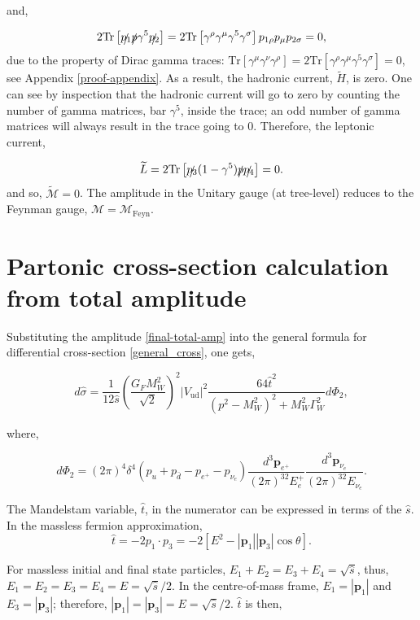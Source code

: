 \documentclass[a4paper,11pt]{article}
\begin{document}
and,

$$2\text{Tr}\left[\slashed{p_1}\slashed{p}\gamma^5\slashed{p_2}\right] = 2\text{Tr}\left[\gamma^\rho \gamma^\mu \gamma^5 \gamma^\sigma\right] p_{1\rho}p_\mu p_{2\sigma} = 0,$$
due to the property of Dirac gamma traces: $\text{Tr}\left[\gamma^\mu \gamma^\nu \gamma^\rho \right] = 2\text{Tr}\left[\gamma^\rho \gamma^\mu \gamma^5 \gamma^\sigma \right] = 0$, see Appendix \ref{proof-appendix}. As a result,  the hadronic current, $\widetilde{H}$, is zero. One can see by inspection that the hadronic current will go to zero by counting the number of gamma matrices, bar $\gamma^5$, inside the trace; an odd number of gamma matrices will always result in the trace going to 0. Therefore, the leptonic current,

$$\widetilde{L}= 2\text{Tr}\left[ \slashed{p_3}(1-\gamma^5) \slashed{p} \slashed{p_4}\right] =0.$$
and so, $\widetilde{\mathcal{M}} = 0$. The amplitude in the Unitary gauge (at tree-level) reduces to the Feynman gauge, $\mathcal{M} = \mathcal{M}_\text{Feyn}.$



\section{Partonic cross-section calculation from total amplitude}\label{sec6}
Substituting the amplitude \ref{final-total-amp} into the general formula for differential cross-section \ref{general_cross}, one gets,

$$
	d\hat{\sigma}  =  \frac{1}{12\hat{s}}\left(\frac{G_FM_W^2}{\sqrt{2}}\right)^2|V_\text{ud}|^2 \frac{64 \hat{t}^2}{(p^2-M_W^2)^2 +M_W^2\Gamma_W^2}d\Phi_{2},
$$

where, 

$$d\Phi_{2} = (2\pi)^4 \delta^4(p_u +p_{\bar{d}} - p_{e^+} - p_{\nu_e}) \frac{d^3\boldsymbol{p}_{e^+}}{(2\pi)^32E_e^+} \frac{d^3\boldsymbol{p}_{\nu_e}}{(2\pi)^32E_{\nu_e}}. $$

The Mandelstam variable, $\hat{t}$, in the numerator can be expressed in terms of the $\hat{s}$. In the massless fermion approximation, $$\hat{t} = -2p_1\cdot p_3 = -2\left[E^2 - |\boldsymbol{p}_1||\boldsymbol{p}_3|\cos\theta \right].$$ 

For massless initial and final state particles, $E_1 + E_2 = E_3 + E_4 = \sqrt{\hat{s}}$, thus, $E_1 = E_2 = E_3 = E_4 = E= \sqrt{\hat{s}}/2$. In the centre-of-mass frame, $E_1 = |\boldsymbol{p}_1|$ and $E_3 = |\boldsymbol{p}_3|$; therefore,  $|\boldsymbol{p}_1| = |\boldsymbol{p}_3| = E = \sqrt{\hat{s}}/2$. $\hat{t}$ is then,
\end{document}
